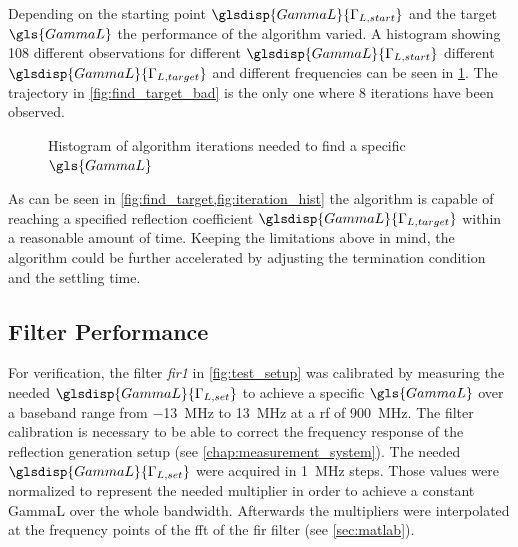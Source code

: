 \documentclass[12pt,a4paper,parskip=full,abstract=true,BCOR=12mm,twoside,open=right]{scrreprt}
\def\device#1{\textit{#1}}
\begin{document}
Depending on the starting point $\glsdisp{GammaL}{\Gamma_{L,start}}$ and the target $\gls{GammaL}$
the performance of the algorithm varied. A histogram showing 108 different
observations for different $\glsdisp{GammaL}{\Gamma_{L,start}}$ different $\glsdisp{GammaL}{\Gamma_{L,target}}$ and
different frequencies can be seen in \cref{fig:iteration_hist}. The trajectory
in \cref{fig:find_target_bad} is the only one where 8 iterations have been observed.

\begin{figure}[htb]
    \centering
    \caption{Histogram of algorithm iterations needed to find a specific $\gls{GammaL}$}
    \label{fig:iteration_hist}
\end{figure}

As can be seen in \cref{fig:find_target,fig:iteration_hist} the algorithm is capable
of reaching a specified reflection coefficient $\glsdisp{GammaL}{\Gamma_{L,target}}$ within a reasonable
amount of time. Keeping the limitations above in mind, the algorithm could be further
accelerated by adjusting the termination condition and the settling time.

\subsection{Filter Performance}
\label{sec:filter}

For verification, the filter \device{fir1} in \cref{fig:test_setup} was calibrated
by measuring the needed $\glsdisp{GammaL}{\Gamma_{L,set}}$ to achieve a specific $\gls{GammaL}$ over a
baseband range from \SI{-13}{\mega\hertz} to \SI{13}{\mega\hertz} at a \gls{rf} of
\SI{900}{\mega\hertz}. The filter calibration is necessary to be able to correct
the frequency response of the reflection generation setup (see \cref{chap:measurement_system}). The needed
$\glsdisp{GammaL}{\Gamma_{L,set}}$ were acquired in \SI{1}{\mega\hertz} steps. Those
values were normalized to represent the needed multiplier in order
to achieve a constant \gls{GammaL} over the whole bandwidth. Afterwards the multipliers
were interpolated at the frequency points of the \gls{fft} of the \gls{fir} filter (see \cref{sec:matlab}).
\end{document}
